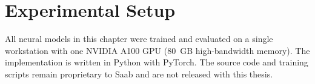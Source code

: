 \section{Experimental Setup}\label{sec:exp:setup}

All neural models in this chapter were trained and evaluated on a single workstation with one NVIDIA A100 GPU (80~GB high-bandwidth memory).
The implementation is written in Python with PyTorch.
The source code and training scripts remain proprietary to Saab and are not released with this thesis.
